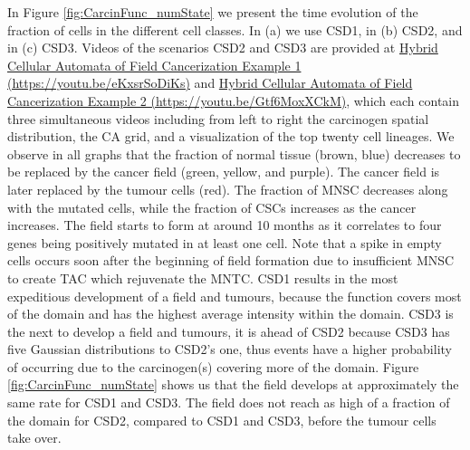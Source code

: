 \documentclass[\main/thesis.tex]{subfiles}
\begin{document}
In Figure \ref{fig:CarcinFunc_numState} we present the time evolution of the fraction of cells in the different cell classes. In (a) we use CSD1, in (b) CSD2, and in (c) CSD3. Videos of the scenarios CSD2 and CSD3 are provided at \href{https://youtu.be/eKxsrSoDiKs}{Hybrid Cellular Automata of Field Cancerization Example 1 (https://youtu.be/eKxsrSoDiKs)} and \href{https://youtu.be/Gtf6MoxXCkM}{Hybrid Cellular Automata of Field Cancerization Example 2 \newline(https://youtu.be/Gtf6MoxXCkM)}, which each contain three simultaneous videos including from left to right the carcinogen spatial distribution, the CA grid, and a visualization of the top twenty cell lineages. We observe in all graphs that the fraction of normal tissue (brown, blue) decreases to be replaced by the cancer field (green, yellow, and purple). The cancer field is later replaced by the tumour cells (red). The fraction of MNSC decreases along with the mutated cells, while the fraction of CSCs increases as the cancer increases. The field starts to form at around 10 months as it correlates to four genes being positively mutated in at least one cell. Note that a spike in empty cells occurs soon after the beginning of field formation due to insufficient MNSC to create TAC which rejuvenate the MNTC. CSD1 results in the most expeditious development of a field and tumours, because the function covers most of the domain and has the highest average intensity within the domain. CSD3 is the next to develop a field and tumours, it is ahead of CSD2 because CSD3 has five Gaussian distributions to CSD2's one, thus events have a higher probability of occurring due to the carcinogen(s) covering more of the domain. Figure \ref{fig:CarcinFunc_numState} shows us that the field develops at approximately the same rate for CSD1 and CSD3. The field does not reach as high of a fraction of the domain for CSD2, compared to CSD1 and CSD3, before the tumour cells take over. 
\end{document}
